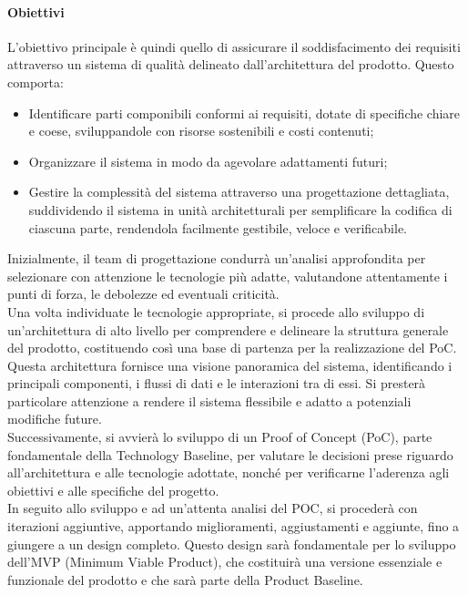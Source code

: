 \paragraph{Obiettivi}
L'obiettivo principale è quindi quello di assicurare il soddisfacimento dei requisiti attraverso un sistema di qualità delineato dall'architettura del prodotto. Questo comporta:
\begin{itemize}
    \item Identificare parti componibili conformi ai requisiti, dotate di specifiche chiare e coese, sviluppandole con risorse sostenibili e costi contenuti;
    \item Organizzare il sistema in modo da agevolare adattamenti futuri;
    \item Gestire la complessità del sistema attraverso una progettazione dettagliata, suddividendo il sistema in unità architetturali per semplificare la codifica di ciascuna parte, rendendola facilmente gestibile, veloce e verificabile.
\end{itemize}
Inizialmente, il team di progettazione condurrà un'analisi approfondita per selezionare con attenzione le tecnologie più adatte, valutandone attentamente i punti di forza, le debolezze ed eventuali criticità. \\
Una volta individuate le tecnologie appropriate, si procede allo sviluppo di un'architettura di alto livello per comprendere e delineare la struttura generale del prodotto, costituendo così una base di partenza per la realizzazione del PoC.
Questa architettura fornisce una visione panoramica del sistema, identificando i principali componenti, i flussi di dati e le interazioni tra di essi. Si presterà particolare attenzione a rendere il sistema flessibile e adatto a potenziali modifiche future. \\
Successivamente, si avvierà lo sviluppo di un Proof of Concept (PoC), parte fondamentale della Technology Baseline, per valutare le decisioni prese riguardo all'architettura e alle tecnologie adottate, nonché per verificarne l'aderenza agli obiettivi e alle specifiche del progetto. \\
In seguito allo sviluppo e ad un'attenta analisi del POC, si procederà con iterazioni aggiuntive, apportando miglioramenti, aggiustamenti e aggiunte, fino a giungere a un design completo. Questo design sarà fondamentale per lo sviluppo dell'MVP (Minimum Viable Product), che costituirà una versione essenziale e funzionale del prodotto e che sarà parte della Product Baseline.

